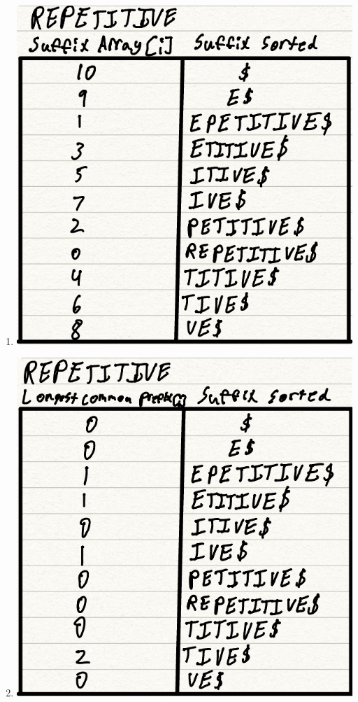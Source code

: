 \documentclass[12pt,letterpaper]{article}
\begin{document}
\begin{enumerate}
    \item \includegraphics[scale=.4]{images/Suffix_array-1.jpeg}
    \item \includegraphics[scale=.4]{images/LCP-1.jpeg}

\end{enumerate}
\end{document}
